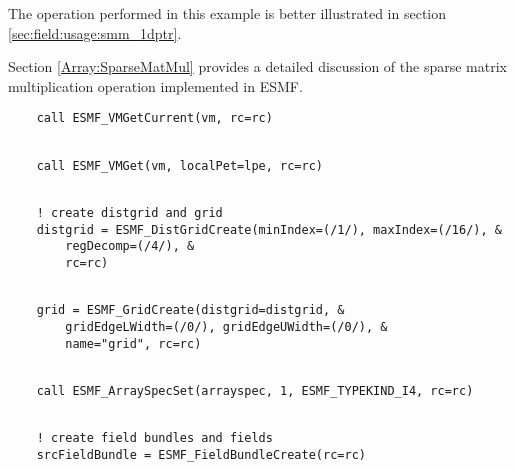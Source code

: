    The operation performed in this example is better illustrated in 
   section \ref{sec:field:usage:smm_1dptr}.
   
   Section \ref{Array:SparseMatMul} provides a detailed discussion of the 
   sparse matrix multiplication operation implemented in ESMF. 

 \begin{verbatim}
    call ESMF_VMGetCurrent(vm, rc=rc)
 
\end{verbatim}
 

 \begin{verbatim}
    call ESMF_VMGet(vm, localPet=lpe, rc=rc)
 
\end{verbatim}
 

 \begin{verbatim}
    ! create distgrid and grid
    distgrid = ESMF_DistGridCreate(minIndex=(/1/), maxIndex=(/16/), &
        regDecomp=(/4/), &
        rc=rc)
 
\end{verbatim}
 

 \begin{verbatim}
    grid = ESMF_GridCreate(distgrid=distgrid, &
        gridEdgeLWidth=(/0/), gridEdgeUWidth=(/0/), &
        name="grid", rc=rc)
 
\end{verbatim}
 

 \begin{verbatim}
    call ESMF_ArraySpecSet(arrayspec, 1, ESMF_TYPEKIND_I4, rc=rc)
 
\end{verbatim}
 

 \begin{verbatim}
    ! create field bundles and fields
    srcFieldBundle = ESMF_FieldBundleCreate(rc=rc)
 
\end{verbatim}
 
